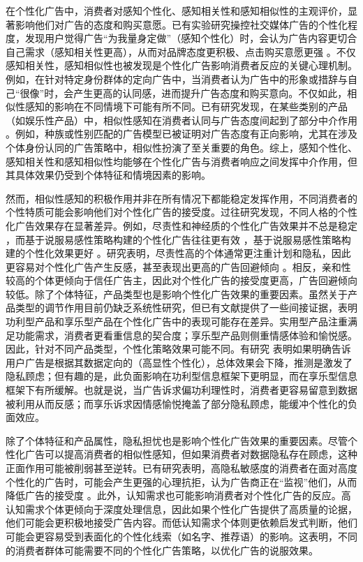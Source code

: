 在个性化广告中，消费者对感知个性化、感知相关性和感知相似性的主观评价，显著影响他们对广告的态度和购买意愿。已有实验研究操控社交媒体广告的个性化程度，发现用户觉得广告“为我量身定做”（感知个性化）时，会认为广告内容更切合自己需求（感知相关性更高），从而对品牌态度更积极、点击购买意愿更强 \citep{de2015me}。不仅感知相关性，感知相似性也被发现是个性化广告影响消费者反应的关键心理机制。例如，在针对特定身份群体的定向广告中，当消费者认为广告中的形象或措辞与自己“很像”时，会产生更高的认同感，进而提升广告态度和购买意向\citep{li2016does}。不仅如此，相似性感知的影响在不同情境下可能有所不同。已有研究发现，在某些类别的产品（如娱乐性产品）中，相似性感知在消费者认同与广告态度间起到了部分中介作用 \citep{madadi2021impact}。例如，种族或性别匹配的广告模型已被证明对广告态度有正向影响，尤其在涉及个体身份认同的广告策略中，相似性扮演了至关重要的角色。综上，感知个性化、感知相关性和感知相似性均能够在个性化广告与消费者响应之间发挥中介作用，但其具体效果仍受到个体特征和情境因素的影响。

然而，相似性感知的积极作用并非在所有情况下都能稳定发挥作用，不同消费者的个性特质可能会影响他们对个性化广告的接受度。过往研究发现，不同人格的个性化广告效果存在显著差异。例如，尽责性和神经质的个性化广告效果并不总是稳定 \citep{matz2024potential}，而基于说服易感性策略构建的个性化广告往往更有效 ，基于说服易感性策略构建的个性化效果更好 \citep{winter2021effects}。研究表明，尽责性高的个体通常更注重计划和隐私，因此更容易对个性化广告产生反感，甚至表现出更高的广告回避倾向 \citep{cao2024effects}。相反，亲和性较高的个体更倾向于信任广告主，因此对个性化广告的接受度更高，广告回避倾向较低。除了个体特征，产品类型也是影响个性化广告效果的重要因素。虽然关于产品类型的调节作用目前仍缺乏系统性研究，但已有文献提供了一些间接证据，表明功利型产品和享乐型产品在个性化广告中的表现可能存在差异。实用型产品注重满足功能需求，消费者更看重信息的契合度；享乐型产品则侧重情感体验和愉悦感。因此，针对不同产品类型，个性化策略效果可能不同。有研究 \citep{tsekouras2024don}表明如果明确告诉用户广告是根据其数据定向的（高显性个性化），总体效果会下降，推测是激发了隐私顾虑；但有趣的是，此负面影响在功利型信息框架下更明显，而在享乐型信息框架下有所缓解。也就是说，当广告诉求偏功利理性时，消费者更容易留意到数据被利用从而反感；而享乐诉求因情感愉悦掩盖了部分隐私顾虑，能缓冲个性化的负面效应。

除了个体特征和产品属性，隐私担忧也是影响个性化广告效果的重要因素。尽管个性化广告可以提高消费者的相似性感知，但如果消费者对数据隐私存在顾虑，这种正面作用可能被削弱甚至逆转。已有研究表明，高隐私敏感度的消费者在面对高度个性化的广告时，可能会产生更强的心理抗拒，认为广告商正在“监视”他们，从而降低广告的接受度 \citep{lina2021privacy}。此外，认知需求也可能影响消费者对个性化广告的反应。高认知需求个体更倾向于深度处理信息，因此如果个性化广告提供了高质量的论据，他们可能会更积极地接受广告内容。而低认知需求个体则更依赖启发式判断，他们可能会更容易受到表面化的个性化线索（如名字、推荐语）的影响。这表明，不同的消费者群体可能需要不同的个性化广告策略，以优化广告的说服效果。

